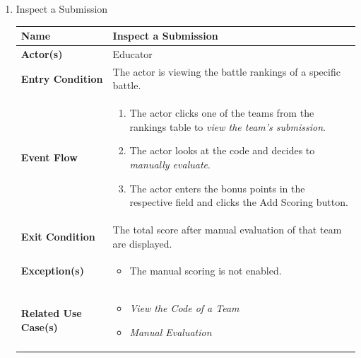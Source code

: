 \begin{enumerate}
\newpage
\item Inspect a Submission
\begin{center}
    \begin{tabular}{ | m{10em} | m{10cm}| } 
      \hline
      \textbf{Name} & Inspect a Submission \\ 
      \hline
      \textbf{Actor(s)} & Educator \\ 
      \hline
      \textbf{Entry Condition} & The actor is viewing the battle rankings of a specific battle. \\ 
      \hline
      \textbf{Event Flow} & 
          \begin{enumerate}[(1)]
              \item The actor clicks one of the teams from the rankings table to \textit{view the team's submission}.
              \item The actor looks at the code and decides to \textit{manually evaluate}.
              \item The actor enters the bonus points in the respective field and clicks the Add Scoring button.
          \end{enumerate}
      \\ 
      \hline
      \textbf{Exit Condition} & The total score after manual evaluation of that team are displayed.  \\ 
      \hline
      \textbf{Exception(s)} & 
      \begin{itemize}
          \item The manual scoring is not enabled.
      \end{itemize}
          \\ 
      \hline
      \textbf{Related Use Case(s)} & 
      \begin{itemize}
\item \textit{View the Code of a Team}
\item \textit{Manual Evaluation}
      \end{itemize}
          \\ 
      \hline
    \end{tabular}
    \label{tbl:uc8}
\end{center}


\newpage



\end{enumerate}
